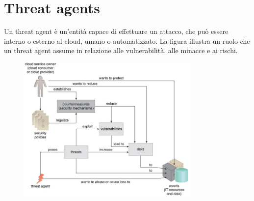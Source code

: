 \section{Threat agents}
Un threat agent è un'entità capace di effettuare un attacco, che può essere interno o esterno al cloud, umano o automatizzato. La figura illustra un ruolo che un threat agent assume in relazione alle vulnerabilità, alle minacce e ai rischi.

\begin{figure}[htb!]
    \centering
    \includegraphics[width=9cm]{./Images/cap7/7.1.png}
\end{figure}

